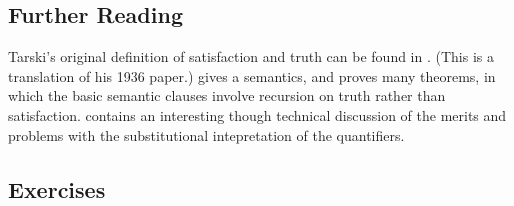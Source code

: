 {\small
\subsection*{Further Reading}

 Tarski's original definition of satisfaction and truth can be found in \citet{tarcontrf}. (This is a translation of his 1936 paper.) \citet[\S\S 3.4--3.6]{bosintlo}  gives a semantics, and proves many theorems, in which the basic semantic clauses involve recursion on truth rather than satisfaction.  \citet{kriisthp} contains an interesting though technical discussion of the merits and problems with the substitutional intepretation of the quantifiers.



\subsection*{Exercises}


}
